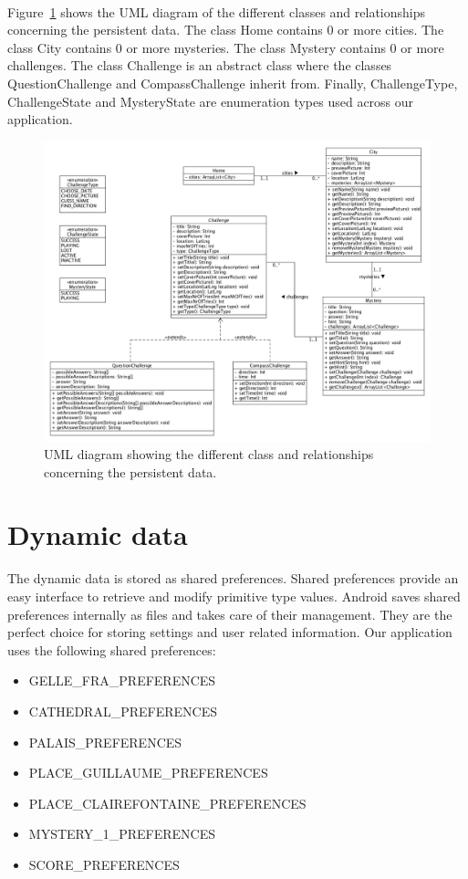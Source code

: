 \noindent
\\
Figure~\ref{fig:UMLDiagram} shows the UML diagram of the different classes and relationships concerning the persistent data. The class Home contains 0 or more cities. The class City contains 0 or more mysteries. The class Mystery contains 0 or more challenges. The class Challenge is an abstract class where the classes QuestionChallenge and CompassChallenge inherit from. Finally, ChallengeType, ChallengeState and MysteryState are enumeration types used across our application.

\begin{figure}[H]
	\centering
	\includegraphics[scale=0.4]{Figures/PersistentData}
	\caption{UML diagram showing the different class and relationships concerning the persistent data.}
	\label{fig:UMLDiagram}
\end{figure}

\section{Dynamic data}

The dynamic data is stored as shared preferences. Shared preferences provide an easy interface to retrieve and modify primitive type values. Android saves shared preferences internally as files and takes care of their management. They are the perfect choice for storing settings and user related information. Our application uses the following shared preferences:

\begin{itemize}
	\item GELLE\_FRA\_PREFERENCES
	\item CATHEDRAL\_PREFERENCES
	\item PALAIS\_PREFERENCES
	\item PLACE\_GUILLAUME\_PREFERENCES
	\item PLACE\_CLAIREFONTAINE\_PREFERENCES
	\item MYSTERY\_1\_PREFERENCES
	\item SCORE\_PREFERENCES
\end{itemize}

